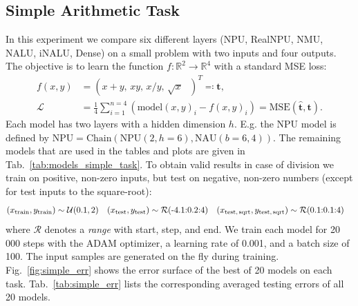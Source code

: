 \documentclass[9pt]{article}
\newcommand{\npu}{\text{NPU}}
\newcommand{\nau}{\text{NAU}}
\newcommand{\chain}{\text{Chain}}
\begin{document}
\subsection{Simple Arithmetic Task}%
\label{sub:simple_arithmetic_task}

In this experiment we compare six different layers (NPU, RealNPU, NMU, NALU,
iNALU, Dense) on a small problem with two inputs and four outputs. The
objective is to learn the function $f: \mathbb{R}^2
\rightarrow \mathbb{R}^4$ with a standard MSE loss:
\begin{align}
  \label{eq:simple_f}
  f(x,y) &= (x+y,\, xy,\, x/y,\, \sqrt{x} \text{  })^T \eqqcolon \bm t, \\
  \mathcal L &= \frac{1}{4} \sum_{i=1}^{n=4}\left(\text{model}(x,y)_i - f(x,y)_i\right)
             = \text{MSE}(\bm{\hat t}, \bm t).
\end{align}
Each model has two layers with a hidden dimension $h$.  E.g. the NPU model is
defined by $\npu=\chain(\npu(2,h=6),\nau(b=6,4))$.  The remaining models that are
used in the tables and plots are given in Tab.~\ref{tab:models_simple_task}.
To obtain valid results in case of division we train on positive, non-zero
inputs, but test on negative, non-zero numbers (except for test inputs to the
square-root):
\begin{align}
  \label{eq:simple_train}
  (x_{\text{train}}, y_{\text{train}}) &\sim \mathcal{U}(0.1,2) &
  (x_{\text{test}}, y_{\text{test}}) &\sim \mathcal{R}(\text{-4.1:0.2:4}) &
  (x_{\text{test,\,sqrt}}, y_{\text{test,\,sqrt}}) &\sim \mathcal{R}(\text{0.1:0.1:4})
\end{align}
where $\mathcal{R}$ denotes a \emph{range} with start, step, and end.
We train each model for 20\,000 steps with the ADAM optimizer, a learning rate of
0.001, and a batch size of 100. The input samples are generated on the fly
during training. Fig.~\ref{fig:simple_err} shows the error surface of the best
of 20 models on each task. Tab.~\ref{tab:simple_err} lists the corresponding
averaged testing errors of all 20 models.
\end{document}
